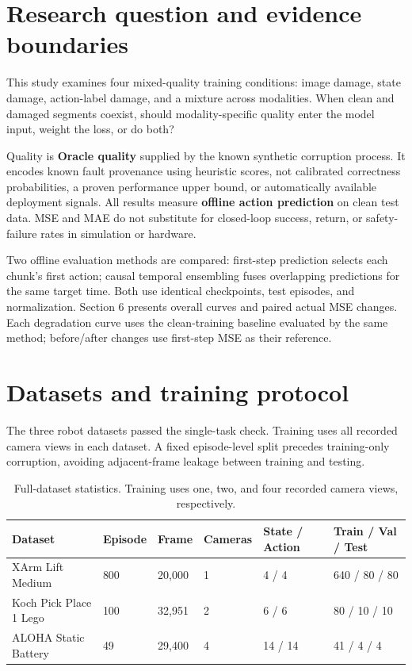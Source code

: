 \documentclass[11pt,a4paper]{article}
\begin{document}
\section{Research question and evidence boundaries}

This study examines four mixed-quality training conditions: image damage, state damage, action-label damage, and a mixture across modalities. When clean and damaged segments coexist, should modality-specific quality enter the model input, weight the loss, or do both?

Quality is \textbf{Oracle quality} supplied by the known synthetic corruption process. It encodes known fault provenance using heuristic scores, not calibrated correctness probabilities, a proven performance upper bound, or automatically available deployment signals. All results measure \textbf{offline action prediction} on clean test data. MSE and MAE do not substitute for closed-loop success, return, or safety-failure rates in simulation or hardware.

Two offline evaluation methods are compared: first-step prediction selects each chunk's first action; causal temporal ensembling fuses overlapping predictions for the same target time. Both use identical checkpoints, test episodes, and normalization. Section 6 presents overall curves and paired actual MSE changes. Each degradation curve uses the clean-training baseline evaluated by the same method; before/after changes use first-step MSE as their reference.

\section{Datasets and training protocol}

The three robot datasets passed the single-task check. Training uses all recorded camera views in each dataset. A fixed episode-level split precedes training-only corruption, avoiding adjacent-frame leakage between training and testing.

\begin{table}[htbp]
\centering
\small
\begin{tabularx}{\linewidth}{Y C{14mm} C{18mm} C{14mm} C{22mm} C{24mm}}
\toprule
Dataset & Episode & Frame & Cameras & State / Action & Train / Val / Test\\
\midrule
XArm Lift Medium & 800 & 20,000 & 1 & 4 / 4 & 640 / 80 / 80\\
Koch Pick Place 1 Lego & 100 & 32,951 & 2 & 6 / 6 & 80 / 10 / 10\\
ALOHA Static Battery & 49 & 29,400 & 4 & 14 / 14 & 41 / 4 / 4\\
\bottomrule
\end{tabularx}
\caption{Full-dataset statistics. Training uses one, two, and four recorded camera views, respectively.}
\end{table}
\end{document}
